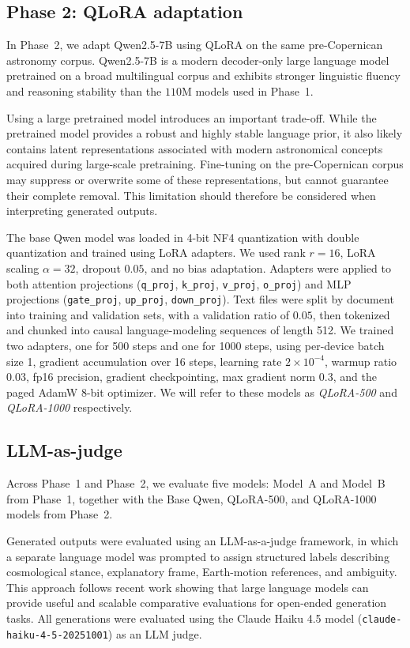 \subsection{Phase 2: QLoRA adaptation}

In Phase~2, we adapt Qwen2.5-7B \cite{qwen25} using QLoRA \cite{dettmers2023qlora} on the same pre-Copernican astronomy corpus. Qwen2.5-7B is a modern decoder-only large language model pretrained on a broad multilingual corpus and exhibits stronger linguistic fluency and reasoning stability than the $110$M models used in Phase~1. 

Using a large pretrained model introduces an important trade-off. While the pretrained model provides a robust and highly stable language prior, it also likely contains latent representations associated with modern astronomical concepts acquired during large-scale pretraining. Fine-tuning on the pre-Copernican corpus may suppress or overwrite some of these representations, but cannot guarantee their complete removal. This limitation should therefore be considered when interpreting generated outputs. 

The base Qwen model was loaded in 4-bit NF4 quantization with double quantization and trained using LoRA adapters. We used rank $r=16$, LoRA scaling $\alpha=32$, dropout $0.05$, and no bias adaptation. Adapters were applied to both attention projections (\texttt{q\_proj}, \texttt{k\_proj}, \texttt{v\_proj}, \texttt{o\_proj}) and MLP projections (\texttt{gate\_proj}, \texttt{up\_proj}, \texttt{down\_proj}). Text files were split by document into training and validation sets, with a validation ratio of $0.05$, then tokenized and chunked into causal language-modeling sequences of length 512. We trained two adapters, one for 500 steps and one for 1000 steps, using per-device batch size 1, gradient accumulation over 16 steps, learning rate $2\times10^{-4}$, warmup ratio $0.03$, fp16 precision, gradient checkpointing, max gradient norm $0.3$, and the paged AdamW 8-bit optimizer. We will refer to these models as \textit{QLoRA-500} and \textit{QLoRA-1000} respectively.


\subsection{LLM-as-judge}
Across Phase~1 and Phase~2, we evaluate five models: Model~A and Model~B from Phase~1, together with the Base Qwen, QLoRA-500, and QLoRA-1000 models from Phase~2.

Generated outputs were evaluated using an LLM-as-a-judge framework, in which a separate language model was prompted to assign structured labels describing cosmological stance, explanatory frame, Earth-motion references, and ambiguity. This approach follows recent work \cite{huang-etal-2025-empirical,zheng2023judging} showing that large language models can provide useful and scalable comparative evaluations for open-ended generation tasks. All generations were evaluated using the Claude Haiku 4.5 model (\texttt{claude-haiku-4-5-20251001}) as an LLM judge.


